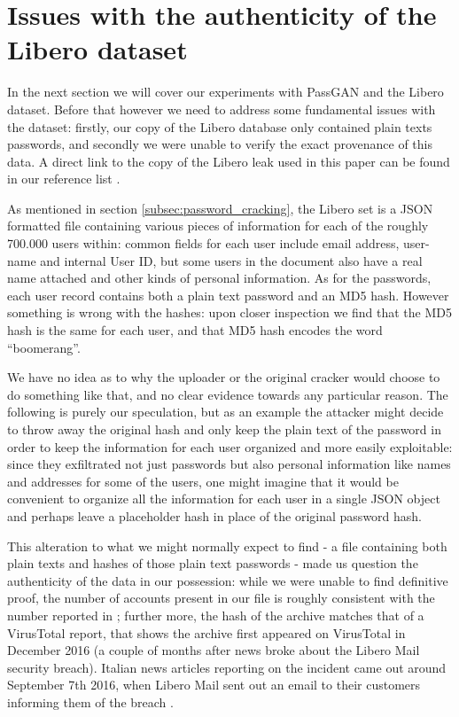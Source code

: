 \section{Issues with the authenticity of the Libero dataset}\label{sec:libero}
In the next section we will cover our experiments with PassGAN and the Libero dataset.
Before that however we need to address some fundamental issues with the dataset: firstly, our copy of the Libero database only contained plain texts passwords, and secondly we were unable to verify the exact provenance of this data.
A direct link to the copy of the Libero leak used in this paper can be found in our reference list \cite{passgan-download}.

As mentioned in section \ref{subsec:password_cracking}, the Libero set is a JSON formatted file containing various pieces of information for each of the roughly 700.000 users within: common fields for each user include email address, user-name and internal User ID, but some users in the document also have a real name attached and other kinds of personal information.  As for the passwords, each user record contains both a plain text password and an MD5 hash.
However something is wrong with the hashes: upon closer inspection we find that the MD5 hash is the same for each user, and that MD5 hash encodes the word \enquote{boomerang}.

We have no idea as to why the uploader or the original cracker would choose to do something like that, and no clear evidence towards any particular reason. The following is purely our speculation, but as an example the attacker might decide to throw away the original hash and only keep the plain text of the password in order to keep the information for each user organized and more easily exploitable: since they exfiltrated not just passwords but also personal information like names and addresses for some of the users, one might imagine that it would be convenient to organize all the information for each user in a single JSON object and perhaps leave a placeholder hash in place of the original password hash.

This alteration to what we might normally expect to find - a file containing both plain texts and hashes of those plain text passwords - made us question the authenticity of the data in our possession: while we were unable to find definitive proof, the number of accounts present in our file is roughly consistent with the number reported in \cite{libero_leak}; further more, the hash of the archive matches that of a VirusTotal report, that shows the archive first appeared on VirusTotal in December 2016 (a couple of months after news broke about the Libero Mail security breach)\cite{virus_total}.
Italian news articles reporting on the incident came out around September 7th 2016, when Libero Mail sent out an email to their customers informing them of the breach \cite{libero-news-wired,libero-news-tomhw,libero-news-fanpage}.

